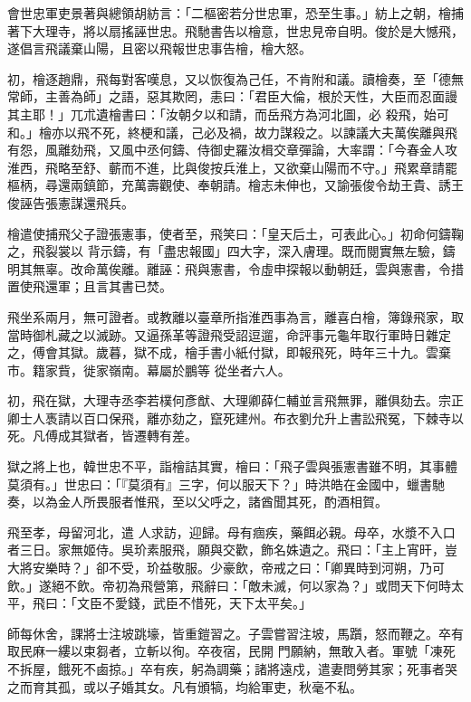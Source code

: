 \begin{pinyinscope}
 會世忠軍吏景著與總領胡紡言：「二樞密若分世忠軍，恐至生事。」紡上之朝，檜捕著下大理寺，將以扇搖誣世忠。飛馳書告以檜意，世忠見帝自明。俊於是大憾飛，遂倡言飛議棄山陽，且密以飛報世忠事告檜，檜大怒。



 初，檜逐趙鼎，飛每對客嘆息，又以恢復為己任，不肯附和議。讀檜奏，至「德無常師，主善為師」之語，惡其欺罔，恚曰：「君臣大倫，根於天性，大臣而忍面謾其主耶！」兀朮遺檜書曰：「汝朝夕以和請，而岳飛方為河北圖，必
 殺飛，始可和。」檜亦以飛不死，終梗和議，己必及禍，故力謀殺之。以諫議大夫萬俟離與飛有怨，風離劾飛，又風中丞何鑄、侍御史羅汝楫交章彈論，大率謂：「今春金人攻淮西，飛略至舒、蘄而不進，比與俊按兵淮上，又欲棄山陽而不守。」飛累章請罷樞柄，尋還兩鎮節，充萬壽觀使、奉朝請。檜志未伸也，又諭張俊令劫王貴、誘王俊誣告張憲謀還飛兵。



 檜遣使捕飛父子證張憲事，使者至，飛笑曰：「皇天后土，可表此心。」初命何鑄鞠之，飛裂裳以
 背示鑄，有「盡忠報國」四大字，深入膚理。既而閱實無左驗，鑄明其無辜。改命萬俟離。離誣：飛與憲書，令虛申探報以動朝廷，雲與憲書，令措置使飛還軍；且言其書已焚。



 飛坐系兩月，無可證者。或教離以臺章所指淮西事為言，離喜白檜，簿錄飛家，取當時御札藏之以滅跡。又逼孫革等證飛受詔逗遛，命評事元龜年取行軍時日雜定之，傅會其獄。歲暮，獄不成，檜手書小紙付獄，即報飛死，時年三十九。雲棄市。籍家貲，徙家嶺南。幕屬於鵬等
 從坐者六人。



 初，飛在獄，大理寺丞李若樸何彥猷、大理卿薛仁輔並言飛無罪，離俱劾去。宗正卿士人褭請以百口保飛，離亦劾之，竄死建州。布衣劉允升上書訟飛冤，下棘寺以死。凡傅成其獄者，皆遷轉有差。



 獄之將上也，韓世忠不平，詣檜詰其實，檜曰：「飛子雲與張憲書雖不明，其事體莫須有。」世忠曰：「『莫須有』三字，何以服天下？」時洪皓在金國中，蠟書馳奏，以為金人所畏服者惟飛，至以父呼之，諸酋聞其死，酌酒相賀。



 飛至孝，母留河北，遣
 人求訪，迎歸。母有痼疾，藥餌必親。母卒，水漿不入口者三日。家無姬侍。吳玠素服飛，願與交歡，飾名姝遺之。飛曰：「主上宵旰，豈大將安樂時？」卻不受，玠益敬服。少豪飲，帝戒之曰：「卿異時到河朔，乃可飲。」遂絕不飲。帝初為飛營第，飛辭曰：「敵未滅，何以家為？」或問天下何時太平，飛曰：「文臣不愛錢，武臣不惜死，天下太平矣。」



 師每休舍，課將士注坡跳壕，皆重鎧習之。子雲嘗習注坡，馬躓，怒而鞭之。卒有取民麻一縷以束芻者，立斬以徇。卒夜宿，民開
 門願納，無敢入者。軍號「凍死不拆屋，餓死不鹵掠。」卒有疾，躬為調藥；諸將遠戍，遣妻問勞其家；死事者哭之而育其孤，或以子婚其女。凡有頒犒，均給軍吏，秋毫不私。




\end{pinyinscope}
